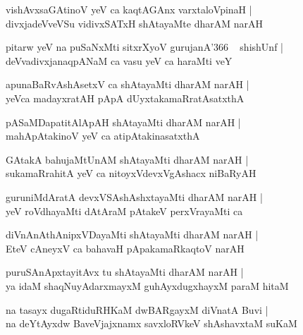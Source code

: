 \documentclass[twoside,12pt,openright]{book}
\newcounter{shloka}[chapter]
\begin{document}
\begin{shloka}%
vishAvxsaGAtinoV yeV ca kaqtAGAnx varxtaloVpinaH |\\
divxjadeVveVSu vidivxSATxH shAtayaMte dharAM narAH 
\end{shloka}

\begin{shloka}%
pitarw yeV na puSaNxMti sitxrXyoV gurujanA\char'366 ~ shishUnf |\\
deVvadivxjanaqpANaM ca vasu yeV ca haraMti veY
\end{shloka}

\begin{shloka}%
apunaBaRvAshAsetxV ca shAtayaMti dharAM narAH |\\
yeVca madayxratAH pApA dUyxtakamaRratAsatxthA 
\end{shloka}

\begin{shloka}%
pASaMDapatitAlApAH shAtayaMti dharAM narAH |\\
mahApAtakinoV yeV ca atipAtakinasatxthA 
\end{shloka}

\begin{shloka}%
GAtakA bahujaMtUnAM shAtayaMti dharAM narAH |\\
sukamaRrahitA yeV ca nitoyxVdevxVgAshacx niBaRyAH
\end{shloka}

\begin{shloka}%
guruniMdAratA devxVSAshAshxtayaMti dharAM narAH |\\
yeV roVdhayaMti dAtAraM pAtakeV perxVrayaMti ca 
\end{shloka}

\begin{shloka}%
diVnAnAthAnipxVDayaMti shAtayaMti dharAM narAH |\\
EteV cAneyxV ca bahavaH pApakamaRkaqtoV narAH 
\end{shloka}

\begin{shloka}%
puruSAnApxtayitAvx tu shAtayaMti dharAM narAH |\\
ya idaM shaqNuyAdarxmayxM guhAyxdugxhayxM paraM hitaM 
\end{shloka}

\begin{shloka}%
na tasayx dugaRtiduRHKaM dwBARgayxM diVnatA Buvi |\\
na deYtAyxdw BaveVjajxnamx savxloRVkeV shAshavxtaM suKaM 
\end{shloka}
\end{document}
